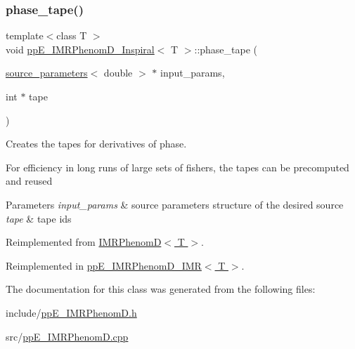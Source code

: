 \subsubsection{\texorpdfstring{phase\+\_\+tape()}{phase\_tape()}}
{\footnotesize\ttfamily template$<$class T $>$ \\
void \hyperlink{classppE__IMRPhenomD__Inspiral}{pp\+E\+\_\+\+I\+M\+R\+Phenom\+D\+\_\+\+Inspiral}$<$ T $>$\+::phase\+\_\+tape (\begin{DoxyParamCaption}\item[{\hyperlink{structsource__parameters}{source\+\_\+parameters}$<$ double $>$ $\ast$}]{input\+\_\+params,  }\item[{int $\ast$}]{tape }\end{DoxyParamCaption})\hspace{0.3cm}{\ttfamily [virtual]}}



Creates the tapes for derivatives of phase. 

For efficiency in long runs of large sets of fishers, the tapes can be precomputed and reused 
\begin{DoxyParams}{Parameters}
{\em input\+\_\+params} & source parameters structure of the desired source \\
\hline
{\em tape} & tape ids \\
\hline
\end{DoxyParams}


Reimplemented from \hyperlink{classIMRPhenomD_ae456c25f87c34487e6e05f9cf5d2d08c}{I\+M\+R\+Phenom\+D$<$ T $>$}.



Reimplemented in \hyperlink{classppE__IMRPhenomD__IMR_acf2ed8617b3e24ecc273a409ff579ce4}{pp\+E\+\_\+\+I\+M\+R\+Phenom\+D\+\_\+\+I\+M\+R$<$ T $>$}.



The documentation for this class was generated from the following files\+:\begin{DoxyCompactItemize}
\item 
include/\hyperlink{ppE__IMRPhenomD_8h}{pp\+E\+\_\+\+I\+M\+R\+Phenom\+D.\+h}\item 
src/\hyperlink{ppE__IMRPhenomD_8cpp}{pp\+E\+\_\+\+I\+M\+R\+Phenom\+D.\+cpp}\end{DoxyCompactItemize}
